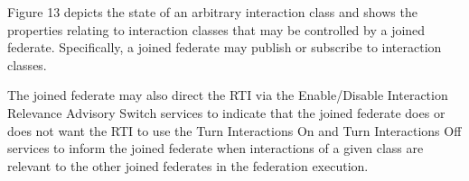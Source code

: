 \clearpage

Figure 13 depicts the state of an arbitrary interaction class and shows the properties relating to interaction classes that may be controlled by a joined federate. Specifically, a joined federate may publish or subscribe to interaction classes.

The joined federate may also direct the RTI via the Enable/Disable Interaction Relevance Advisory Switch services to indicate that the joined federate does or does not want the RTI to use the Turn Interactions On \rtiinitiated{} and Turn Interactions Off \rtiinitiated{} services to inform the joined federate when interactions of a given class are relevant to the other joined federates in the federation execution.

\mbox{}\vfill

\clearpage

